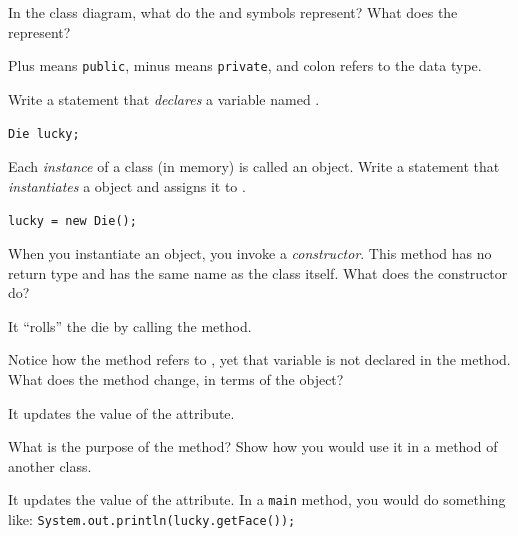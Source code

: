 \Q In the class diagram, what do the \java{-} and \java{+} symbols represent? What does the \java{:} represent?

\begin{answer}
Plus means {\tt public}, minus means {\tt private}, and colon refers to the data type.
\end{answer}


\Q Write a statement that \emph{declares} a  variable named .

\begin{answer}
\tt Die lucky;
\end{answer}


\Q Each \emph{instance} of a class (in memory) is called an object. Write a statement that \emph{instantiates} a   object and assigns it to .

\begin{answer}
\tt lucky = new Die();
\end{answer}


\Q When you instantiate an object, you invoke a \emph{constructor}.
This method has no return type and has the same name as the class itself. What does the  constructor do?

\begin{answer}
It ``rolls'' the die by calling the  method.
\end{answer}


\Q Notice how the  method refers to , yet that variable is not declared in the method. What does the  method change, in terms of the  object?

\begin{answer}
It updates the value of the  attribute.
\end{answer}


\Q What is the purpose of the  method? Show how you would use it in a  method of another class.

\begin{answer}
It updates the value of the  attribute. In a {\tt main} method, you would do something like: {\tt System.out.println(lucky.getFace());}
\end{answer}
